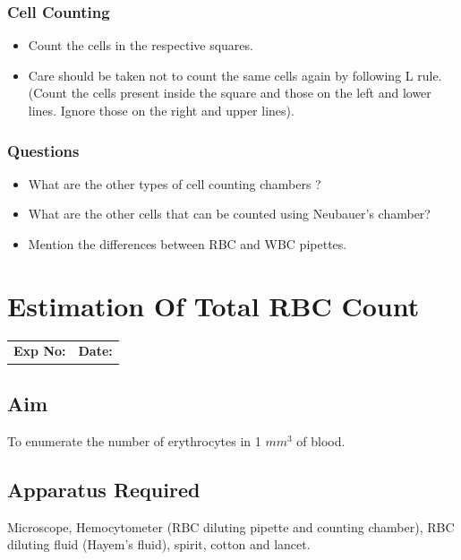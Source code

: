\documentclass[a4paper,12pt]{book}
\begin{document}
	\subsection*{Cell Counting}
	\begin{itemize}

\item{	 Count the cells in the respective squares.}
\item{	 Care should be taken not to count the same cells again by following L rule. (Count the cells present inside the square and those on the left and lower lines. Ignore those on the right and upper lines).}
	\end{itemize}

	\subsection*{Questions}
	
	\begin{itemize}

\item{	 What are the other types of cell counting chambers ?}

\item{	 What are the other cells that can be counted using Neubauer’s chamber?}
\item{	 Mention the differences between RBC and WBC pipettes.}
	\end{itemize}
	
\chapter*{\centering Estimation Of Total RBC Count}

		\begin{tabular}{p{5in} p{1in}}
			\textbf{Exp No:}  & \textbf{Date:}\\
		\end{tabular}

		\section*{Aim}

		 To enumerate the number of  erythrocytes in 1 $mm^3$ of blood.
		\section*{Apparatus Required}
		Microscope, Hemocytometer (RBC diluting pipette and counting chamber), RBC diluting fluid (Hayem’s fluid), spirit, cotton and lancet.
\end{document}
